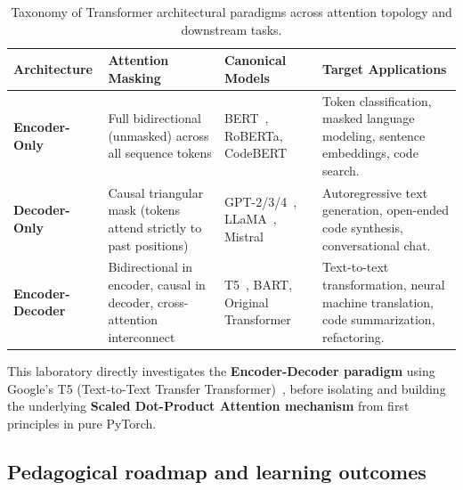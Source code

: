 \documentclass[../labs.tex]{subfiles}
\begin{document}
\begin{table}[htbp]
\centering
\small
\renewcommand{\arraystretch}{1.3}
\begin{tabularx}{\textwidth}{l p{3.2cm} p{3.2cm} X}
\toprule
\textbf{Architecture} & \textbf{Attention Masking} & \textbf{Canonical Models} & \textbf{Target Applications} \\
\midrule
\textbf{Encoder-Only} & Full bidirectional (unmasked) across all sequence tokens & BERT~\cite{devlin2019}, RoBERTa, CodeBERT~\cite{feng2020codebert} & Token classification, masked language modeling, sentence embeddings, code search. \\
\textbf{Decoder-Only} & Causal triangular mask (tokens attend strictly to past positions) & GPT-2/3/4~\cite{radford2019,brown2020}, LLaMA~\cite{touvron2023llama}, Mistral & Autoregressive text generation, open-ended code synthesis, conversational chat. \\
\textbf{Encoder-Decoder} & Bidirectional in encoder, causal in decoder, cross-attention interconnect & T5~\cite{raffel2020t5}, BART, Original Transformer~\cite{vaswani2017} & Text-to-text transformation, neural machine translation, code summarization, refactoring. \\
\bottomrule
\end{tabularx}
\caption{Taxonomy of Transformer architectural paradigms across attention topology and downstream tasks.}
\label{tab:transformer_archetypes}
\end{table}

This laboratory directly investigates the \textbf{Encoder-Decoder paradigm} using Google's T5 (Text-to-Text Transfer Transformer)~\cite{raffel2020t5}, before isolating and building the underlying \textbf{Scaled Dot-Product Attention mechanism} from first principles in pure PyTorch.

\subsection{Pedagogical roadmap and learning outcomes}
\end{document}
